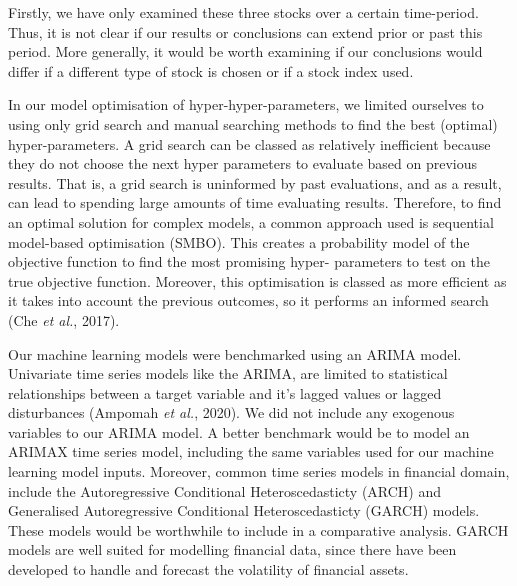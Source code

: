 Firstly, we have only examined these three stocks over a certain time-period. Thus, it is not clear if our results or conclusions can extend prior or past this period. More generally, it would be worth examining if our conclusions would differ if a different type of stock is chosen or if a stock index used. 

In our model optimisation of hyper-hyper-parameters,  we limited ourselves to using only grid search and manual searching methods to find the best (optimal) hyper-parameters. A grid search can be classed as relatively inefficient because they do not choose the next hyper parameters to evaluate based on previous results. That is, a grid search is uninformed by past evaluations, and as a result, can lead to spending large amounts of time evaluating results. Therefore, to find an optimal solution for complex models, a common approach used is sequential model-based optimisation (SMBO). This creates a probability model of the objective function to find the most promising hyper- parameters to test on the true objective function. Moreover, this optimisation is classed as more efficient as it takes into account the previous outcomes, so it performs an informed search (Che \textit{et al.}, 2017).

Our machine learning models were benchmarked using an ARIMA model. Univariate time series models like the ARIMA, are limited to statistical relationships between a target variable and it's lagged values or lagged disturbances (Ampomah \textit{et al.}, 2020). We did not include any exogenous variables to our ARIMA model. A better benchmark would be to model an ARIMAX time series model, including the same variables used for our machine learning model inputs. Moreover, common time series models in financial domain, include the Autoregressive Conditional Heteroscedasticty (ARCH) and Generalised Autoregressive Conditional Heteroscedasticty (GARCH) models. These models would be worthwhile to include in a  comparative analysis. GARCH models are well suited for modelling financial data, since there have been developed to handle and forecast the volatility of financial assets. 


